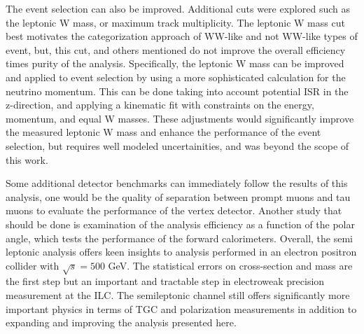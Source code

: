 The event selection can also be improved. Additional cuts were explored such as the leptonic W mass, or maximum track multiplicity. The leptonic W mass cut best motivates the categorization approach of WW-like and not WW-like types of event, but, this cut, and others mentioned do not improve the overall efficiency times purity of the analysis.  Specifically, the leptonic W mass can be improved and applied to event selection by using a more sophisticated calculation for the neutrino momentum. This can be done taking into account potential ISR in the z-direction, and applying a kinematic fit with constraints on the energy, momentum, and equal W masses. These adjustments would significantly improve the measured leptonic W mass and enhance the performance of the event selection, but requires well modeled uncertainities, and was beyond the scope of this work. 
 
Some additional detector benchmarks can immediately follow the results of this analysis, one would be the quality of separation between prompt muons and tau muons to evaluate the performance of the vertex detector. Another study that should be done is examination of the analysis efficiency as a function of the polar angle, which tests the performance of the forward calorimeters.  Overall, the semi leptonic analysis offers keen insights to analysis performed in an electron positron collider with $\sqrt{s} = 500$ GeV. The statistical errors on cross-section and mass are the first step but an important and tractable step in electroweak precision measurement at the ILC.  The semileptonic channel still offers significantly more important physics in terms of TGC and polarization measurements in addition to expanding and improving the analysis presented here. 